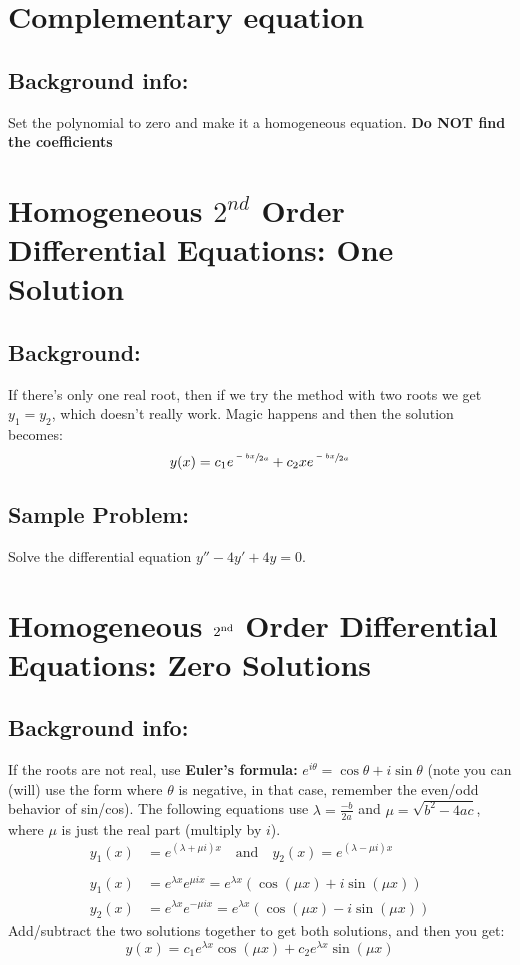 \documentclass{article}
\begin{document}
\hypertarget{cequation}{
    \section*{Complementary equation}
    \subsection*{Background info:}
   	Set the polynomial to zero and make it a homogeneous equation. \textbf{Do NOT find the coefficients} 
}
\hypertarget{oneSolution}{
    \section*{Homogeneous $2^{nd}$ Order Differential Equations: One Solution}
    \subsection*{Background:}
    If there's only one real root, then if we try the method with two roots we get $y_1 = y_2$, which doesn't really work. Magic happens and then the solution becomes: 
  \begin{equation*}
  y(x) = c_1 e^{\sfrac{-bx}{2a}} + c_2 xe^{\sfrac{-bx}{2a}}
  \end{equation*}
    \subsection*{Sample Problem:}
    Solve the differential equation $y'' - 4y' + 4y = 0$.
}
\hypertarget{zeroSolutions}{
    \section*{Homogeneous $2^{\rm nd}$ Order Differential Equations: Zero Solutions}
    \subsection*{Background info:}
    If the roots are not real, use \textbf{Euler's formula:} $e^{i\theta} = \cos\theta + i\sin\theta$ (note you can (will) use the form where $\theta$ is negative, in that case, remember the even/odd behavior of sin/cos). The following equations use $\lambda = \frac{-b}{2a}$ and $\mu = \sqrt{b^2 - 4ac}$, where $\mu$ is just the real part (multiply by $i$). 
  \begin{align*}
	y_1(x) &= e^{(\lambda + \mu i)x} \quad \text{and} \quad y_2(x) = e^{(\lambda - \mu i)x} \\
	\\
	y_1(x) &= e^{\lambda x} e^{\mu i x} = e^{\lambda x} (\cos(\mu x) + i \sin(\mu x)) \\
	y_2(x) &= e^{\lambda x} e^{-\mu i x} = e^{\lambda x} (\cos(\mu x) - i \sin(\mu x))
  \end{align*}
  Add/subtract the two solutions together to get both solutions, and then you get:
  \begin{equation*}
  y(x) = c_1 e^{\lambda x} \cos(\mu x) + c_2 e^{\lambda x} \sin(\mu x)
  \end{equation*}
}
\end{document}
